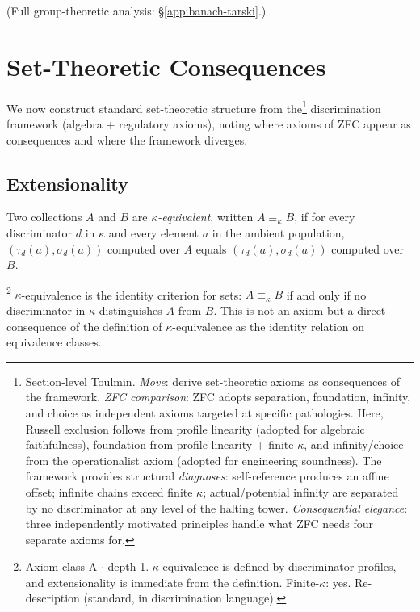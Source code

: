 (Full group-theoretic analysis: \S\ref{app:banach-tarski}.)
\section{Set-Theoretic Consequences}\label{sec:settheory}

We now construct standard set-theoretic structure from the\footnote{Section-level Toulmin. \emph{Move}: derive set-theoretic axioms as consequences of the framework. \emph{ZFC comparison}: ZFC adopts separation, foundation, infinity, and choice as independent axioms targeted at specific pathologies. Here, Russell exclusion follows from profile linearity (adopted for algebraic faithfulness), foundation from profile linearity + finite $\kappa$, and infinity/choice from the operationalist axiom (adopted for engineering soundness). The framework provides structural \emph{diagnoses}: self-reference produces an affine offset; infinite chains exceed finite $\kappa$; actual/potential infinity are separated by no discriminator at any level of the halting tower. \emph{Consequential elegance}: three independently motivated principles handle what ZFC needs four separate axioms for.}
discrimination framework (algebra + regulatory axioms),
noting where axioms of ZFC appear as consequences and
where the framework diverges.

\subsection{Extensionality}

\begin{definition}
Two collections $A$ and $B$ are \emph{$\kappa$-equivalent}, written
$A \equiv_\kappa B$, if for every discriminator $d$ in $\kappa$ and
every element $a$ in the ambient population,
$(\tau_d(a), \sigma_d(a))$ computed over $A$ equals
$(\tau_d(a), \sigma_d(a))$ computed over $B$.
\end{definition}

\begin{theorem}[Extensionality]\label{thm:ext}\footnote{Axiom class \textsf{A} $\cdot$ depth 1.  $\kappa$-equivalence is defined by discriminator profiles, and extensionality is immediate from the definition. Finite-$\kappa$: yes. Re-description (standard, in discrimination language).}
$\kappa$-equivalence is the identity criterion for sets:
$A \equiv_\kappa B$ if and only if no discriminator in $\kappa$
distinguishes $A$ from $B$. This is not an axiom but a direct
consequence of the definition of $\kappa$-equivalence as the
identity relation on equivalence classes.
\end{theorem}

